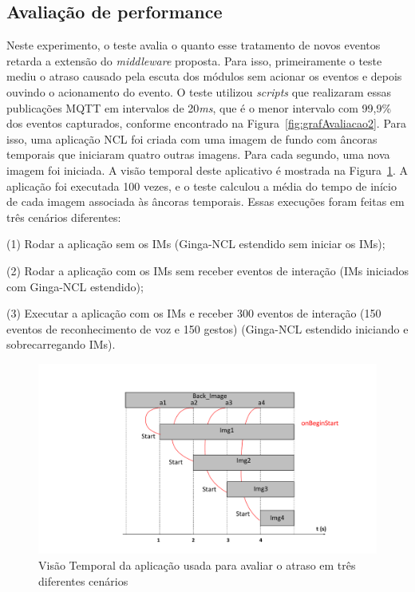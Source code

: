 \subsection{Avaliação de performance} \label{sec:performanceNCL40}

Neste experimento, o teste avalia o quanto esse tratamento de novos eventos retarda a extensão do \textit{middleware} proposta. Para isso, primeiramente o teste mediu o atraso causado pela escuta dos módulos sem acionar os eventos e depois ouvindo o acionamento do evento. O teste utilizou \textit{scripts} que realizaram essas publicações MQTT em intervalos de 20\textit{ms}, que é o menor intervalo com 99,9\% dos eventos capturados, conforme encontrado na Figura~\ref{fig:grafAvaliacao2}. Para isso, uma aplicação NCL foi criada com uma imagem de fundo com âncoras temporais que iniciaram quatro outras imagens. Para cada segundo, uma nova imagem foi iniciada. A visão temporal deste aplicativo é mostrada na Figura~\ref{fig:timeView}. A aplicação foi executada 100 vezes, e o teste calculou a média do tempo de início de cada imagem associada às âncoras temporais. Essas execuções foram feitas em três cenários diferentes: 

             (1) Rodar a aplicação sem os IMs (Ginga-NCL estendido sem iniciar os IMs);
             
             (2) Rodar a aplicação com os IMs sem receber eventos de interação (IMs iniciados com Ginga-NCL estendido);
             
             (3) Executar a aplicação com os IMs e receber 300 eventos de interação (150 eventos de reconhecimento de voz e 150 gestos) (Ginga-NCL estendido iniciando e sobrecarregando IMs).

\begin{figure}[h!]
    \centering
    \includegraphics[scale=0.50, keepaspectratio=true]{figuras/VisaoTemporalAppCarga.pdf}
    \caption{Visão Temporal da aplicação usada para avaliar o atraso em três diferentes cenários}
    \label{fig:timeView}
\end{figure}

